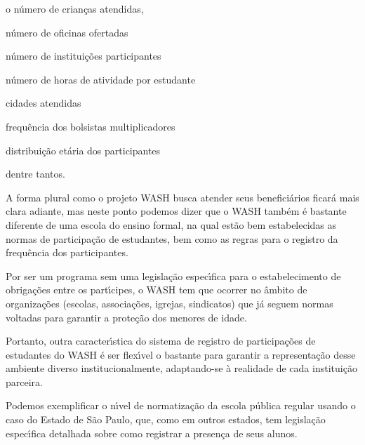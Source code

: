 \documentclass[
12pt,		%
openright,	%
twoside,  %
a4paper,			%
chapter=TITLE,		%
english,			%
french,				%
spanish,			%
brazil				%
]{USPSC-classe/USPSC}
\begin{document}
\begin{alineas}
\item o n\'umero de crian\c{c}as atendidas,
\item n\'umero de oficinas ofertadas
\item n\'umero de institui\c{c}\~oes participantes
\item n\'umero de horas de atividade por estudante
\item cidades atendidas
\item frequ\^encia dos bolsistas multiplicadores
\item distribui\c{c}\~ao et\'aria dos participantes
\end{alineas}

dentre tantos.










A forma plural como o projeto WASH busca atender seus benefici\'arios ficar\'a mais clara adiante, mas neste ponto podemos dizer que o WASH tamb\'em \'e bastante diferente de uma escola do ensino formal, na qual est\~ao bem estabelecidas as normas de participa\c{c}\~ao de estudantes, bem como as regras para o registro da frequ\^encia dos participantes.










Por ser um programa sem uma legisla\c{c}\~ao espec\'{\i}fica para o estabelecimento de obriga\c{c}\~oes entre os part\'{\i}cipes, o WASH tem que ocorrer no \^ambito de organiza\c{c}\~oes (escolas, associa\c{c}\~oes, igrejas, sindicatos) que j\'a seguem normas voltadas para garantir a prote\c{c}\~ao dos menores de idade.










Portanto, outra caracter\'{\i}stica do sistema de registro de participa\c{c}\~oes de estudantes do WASH \'e ser flex\'{\i}vel o bastante para garantir a representa\c{c}\~ao desse ambiente diverso institucionalmente, adaptando-se \`a realidade de cada institui\c{c}\~ao parceira.










Podemos exemplificar o n\'{\i}vel de normatiza\c{c}\~ao da escola p\'ublica regular usando o caso do Estado de S\~ao Paulo, que, como em outros estados, tem legisla\c{c}\~ao espec\'{\i}fica detalhada sobre como registrar a presen\c{c}a de seus alunos.
\end{document}
